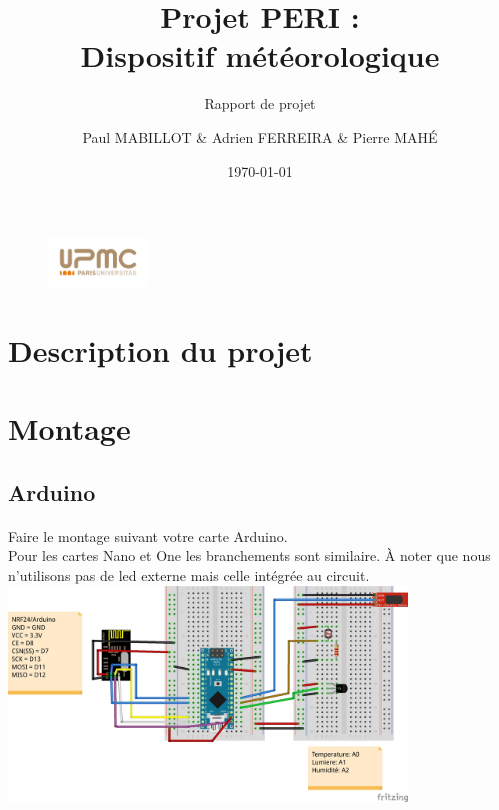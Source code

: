 \documentclass[a4paper, titlepage, oneside, 12pt]{article}%
\title{Projet PERI :\\ Dispositif météorologique}
\subtitle{Rapport de projet}
\author{ Paul MABILLOT \& Adrien FERREIRA \& Pierre MAHÉ}
\date{\today}
\begin{document}
 

\begin{figure}[h]
\maketitle 
\end{figure}

\begin{figure}[b]
	\includegraphics[width=100px] {upmc_logo.jpg}
\end{figure}

\newpage   
   
\tableofcontents

\newpage

\section{Description du projet}
\section{Montage}
\subsection{Arduino}

\paragraph{}
Faire le montage suivant votre carte Arduino. \\ 
Pour les cartes Nano et One les branchements sont similaire. À noter que nous n'utilisons pas de led externe mais celle intégrée au circuit.
\newline
\\
	\includegraphics[width=400px] {montage-arduino-nrF24.jpg}
\end{document}
